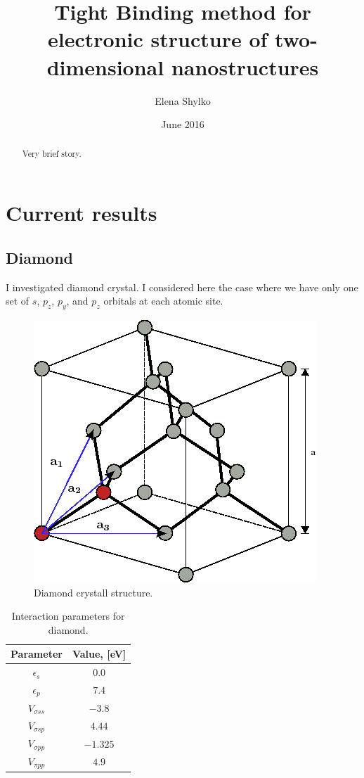 \documentclass{my_pracamgr}
\author{Elena Shylko}
\title{Tight Binding method for electronic structure of two-dimensional nanostructures}
\date{June 2016}
\begin{document}
\maketitle

\begin{abstract}
 Very brief story.
\end{abstract}

\tableofcontents




\chapter{Current results}\label{r:results}
\section{Diamond}
I investigated diamond crystal. I considered here the case where we have only one set of $s$, $p_z$, $p_y$, and $p_z$ orbitals at each
atomic site.
\begin{figure}[h] 
 \begin{center}
  \includegraphics[width=0.3\linewidth]{img/diamond_crystall}
  \caption{Diamond crystall structure.}
 \end{center}
\end{figure}

\begin{table}[h]
 \begin{center}
  \begin{tabular}{|c|c|}
  \hline
    Parameter&Value, [eV]\\ \hline
    $\epsilon_s$ & $0.0$ \\ \hline
    $\epsilon_p$ & $7.4$ \\ \hline
    $V_{\sigma ss}$ & $-3.8$  \\ \hline
    $V_{\sigma sp}$ & $4.44$\\ \hline
    $V_{\sigma pp}$ & $-1.325$ \\ \hline
    $V_{\pi pp}$ &  $4.9$\\ \hline
  \end{tabular}
 \end{center}
  \caption{Interaction parameters for diamond.}
\end{table}
\end{document}
